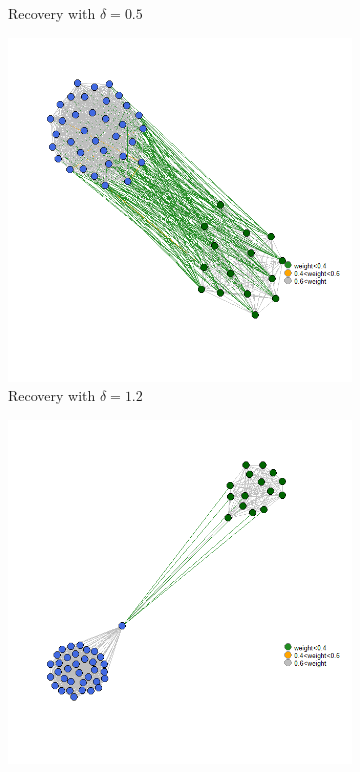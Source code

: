 \documentclass[12pt]{amsart}
\theoremstyle{remark}
\begin{document}
\begin{figure}[H]
\begin{subfigure}[b]{0.37\textwidth}
         \caption{Recovery with $\delta=0.5$}
     \end{subfigure}
     \hfill
     \begin{subfigure}[b]{0.37\textwidth}
         \centering
         \includegraphics[width=\textwidth]{./Pictures/recupera4.png}
         \caption{Recovery with $\delta=1.2$}
     \end{subfigure}
     	\hfill
     \begin{subfigure}[b]{0.37\textwidth}
         \centering
         \includegraphics[width=\textwidth]{./Pictures/recupera5.png}

\end{subfigure}
\end{figure}
\end{document}
